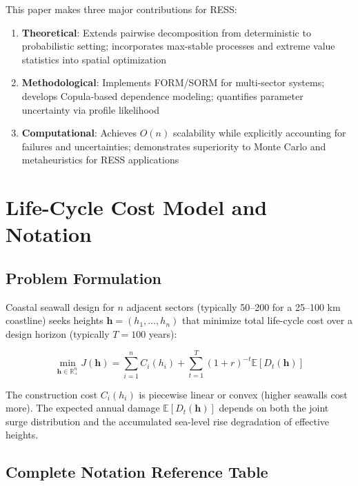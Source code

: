 \documentclass[review]{elsarticle}
\begin{document}
This paper makes three major contributions for RESS:

\begin{enumerate}
\item \textbf{Theoretical}: Extends pairwise decomposition from deterministic to probabilistic setting; incorporates max-stable processes and extreme value statistics into spatial optimization

\item \textbf{Methodological}: Implements FORM/SORM for multi-sector systems; develops Copula-based dependence modeling; quantifies parameter uncertainty via profile likelihood

\item \textbf{Computational}: Achieves $O(n)$ scalability while explicitly accounting for failures and uncertainties; demonstrates superiority to Monte Carlo and metaheuristics for RESS applications
\end{enumerate}

\section{Life-Cycle Cost Model and Notation}

\subsection{Problem Formulation}

Coastal seawall design for $n$ adjacent sectors (typically 50--200 for a 25--100 km coastline) seeks heights $\mathbf{h} = (h_1, \ldots, h_n)$ that minimize total life-cycle cost over a design horizon (typically $T = 100$ years):

\begin{equation}
\min_{\mathbf{h} \in \mathbb{R}_+^n} J(\mathbf{h}) = \sum_{i=1}^n C_i(h_i) + \sum_{t=1}^{T} (1+r)^{-t} \mathbb{E}[D_t(\mathbf{h})]
\label{eq:lcc_objective}
\end{equation}

The construction cost $C_i(h_i)$ is piecewise linear or convex (higher seawalls cost more). The expected annual damage $\mathbb{E}[D_t(\mathbf{h})]$ depends on both the joint surge distribution and the accumulated sea-level rise degradation of effective heights.

\subsection{Complete Notation Reference Table}
\end{document}
